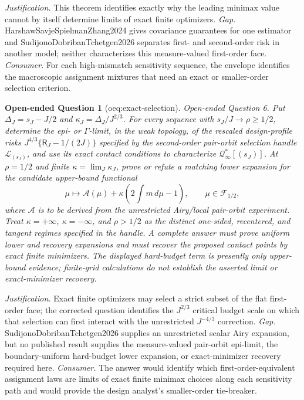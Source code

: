 \documentclass{article}
\newtheorem{openendedquestion}{Open-ended Question}
\begin{document}
\par\smallskip\noindent \textit{Justification.} This theorem identifies exactly why the leading minimax value cannot by itself determine limits of exact finite optimizers. \textit{Gap.} HarshawSavjeSpielmanZhang2024 gives covariance guarantees for one estimator and SudijonoDobribanTchetgen2026 separates first- and second-order risk in another model; neither characterizes this measure-valued first-order face. \textit{Consumer.} For each high-mismatch sensitivity sequence, the envelope identifies the macroscopic assignment mixtures that need an exact or smaller-order selection criterion.

\begin{openendedquestion}[oeq:exact-selection]\label{oeq:exact-selection}
Open-ended Question 6. Put \(\Delta_J=s_J-J/2\) and \(\kappa_J=\Delta_J/J^{2/3}\). For every sequence with \(s_J/J\to\rho\ge1/2\), determine the epi- or \(\Gamma\)-limit, in the weak topology, of the rescaled design-profile risks \(J^{4/3}\{\mathsf R_J-1/(2J)\}\) specified by the second-order pair-orbit selection handle \(\mathcal L_{(s_J)}\), and use its exact contact conditions to characterize \(\mathcal Q^*_{\infty}[(s_J)]\). At \(\rho=1/2\) and finite \(\kappa=\lim_J\kappa_J\), prove or refute a matching lower expansion for the candidate upper-bound functional
\[
 \mu\longmapsto
 \mathcal A(\mu)+\kappa\left(2\int m\,d\mu-1\right),
 \qquad \mu\in\mathcal F_{1/2},
\]
where \(\mathcal A\) is to be derived from the unrestricted Airy/local pair-orbit experiment. Treat \(\kappa=+\infty\), \(\kappa=-\infty\), and \(\rho>1/2\) as the distinct one-sided, recentered, and tangent regimes specified in the handle. A complete answer must prove uniform lower and recovery expansions and must recover the proposed contact points by exact finite minimizers. The displayed hard-budget term is presently only upper-bound evidence; finite-grid calculations do not establish the asserted limit or exact-minimizer recovery.
\end{openendedquestion}
\par\smallskip\noindent \textit{Justification.} Exact finite optimizers may select a strict subset of the flat first-order face; the corrected question identifies the \(J^{2/3}\) critical budget scale on which that selection can first interact with the unrestricted \(J^{-4/3}\) correction. \textit{Gap.} SudijonoDobribanTchetgen2026 supplies an unrestricted scalar Airy expansion, but no published result supplies the measure-valued pair-orbit epi-limit, the boundary-uniform hard-budget lower expansion, or exact-minimizer recovery required here. \textit{Consumer.} The answer would identify which first-order-equivalent assignment laws are limits of exact finite minimax choices along each sensitivity path and would provide the design analyst's smaller-order tie-breaker.
\end{document}
